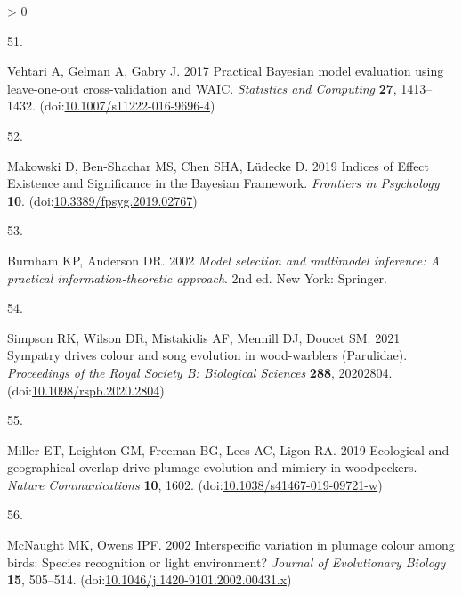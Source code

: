 \documentclass[
  a4paper,
]{article}
\newlength{\cslhangindent}
\newlength{\csllabelwidth}
\newenvironment{CSLReferences}[2] %
 {%
  \setlength{\parindent}{0pt}
  \ifodd #1 \everypar{\setlength{\hangindent}{\cslhangindent}}\ignorespaces\fi
  \ifnum #2 > 0
  \setlength{\parskip}{#2\baselineskip}
  \fi
 }%
 {}
\newcommand{\CSLLeftMargin}[1]{\parbox[t]{\csllabelwidth}{#1}}
\newcommand{\CSLRightInline}[1]{\parbox[t]{\linewidth - \csllabelwidth}{#1}\break}
\begin{document}
\begin{CSLReferences}{0}{0}
\leavevmode\hypertarget{ref-vehtari2017}{}%
\CSLLeftMargin{51. }
\CSLRightInline{Vehtari A, Gelman A, Gabry J. 2017 Practical {Bayesian}
model evaluation using leave-one-out cross-validation and {WAIC}.
\emph{Statistics and Computing} \textbf{27}, 1413--1432.
(doi:\href{https://doi.org/10.1007/s11222-016-9696-4}{10.1007/s11222-016-9696-4})}

\leavevmode\hypertarget{ref-makowski2019}{}%
\CSLLeftMargin{52. }
\CSLRightInline{Makowski D, Ben-Shachar MS, Chen SHA, Lüdecke D. 2019
Indices of {Effect Existence} and {Significance} in the {Bayesian
Framework}. \emph{Frontiers in Psychology} \textbf{10}.
(doi:\href{https://doi.org/10.3389/fpsyg.2019.02767}{10.3389/fpsyg.2019.02767})}

\leavevmode\hypertarget{ref-burnham2002}{}%
\CSLLeftMargin{53. }
\CSLRightInline{Burnham KP, Anderson DR. 2002 \emph{Model selection and
multimodel inference: A practical information-theoretic approach}. 2nd
ed. {New York}: {Springer}. }

\leavevmode\hypertarget{ref-simpson2021}{}%
\CSLLeftMargin{54. }
\CSLRightInline{Simpson RK, Wilson DR, Mistakidis AF, Mennill DJ, Doucet
SM. 2021 Sympatry drives colour and song evolution in wood-warblers
({Parulidae}). \emph{Proceedings of the Royal Society B: Biological
Sciences} \textbf{288}, 20202804.
(doi:\href{https://doi.org/10.1098/rspb.2020.2804}{10.1098/rspb.2020.2804})}

\leavevmode\hypertarget{ref-miller2019}{}%
\CSLLeftMargin{55. }
\CSLRightInline{Miller ET, Leighton GM, Freeman BG, Lees AC, Ligon RA.
2019 Ecological and geographical overlap drive plumage evolution and
mimicry in woodpeckers. \emph{Nature Communications} \textbf{10}, 1602.
(doi:\href{https://doi.org/10.1038/s41467-019-09721-w}{10.1038/s41467-019-09721-w})}

\leavevmode\hypertarget{ref-mcnaught2002}{}%
\CSLLeftMargin{56. }
\CSLRightInline{McNaught MK, Owens IPF. 2002 Interspecific variation in
plumage colour among birds: {Species} recognition or light environment?
\emph{Journal of Evolutionary Biology} \textbf{15}, 505--514.
(doi:\href{https://doi.org/10.1046/j.1420-9101.2002.00431.x}{10.1046/j.1420-9101.2002.00431.x})}

\end{CSLReferences}
\end{document}
